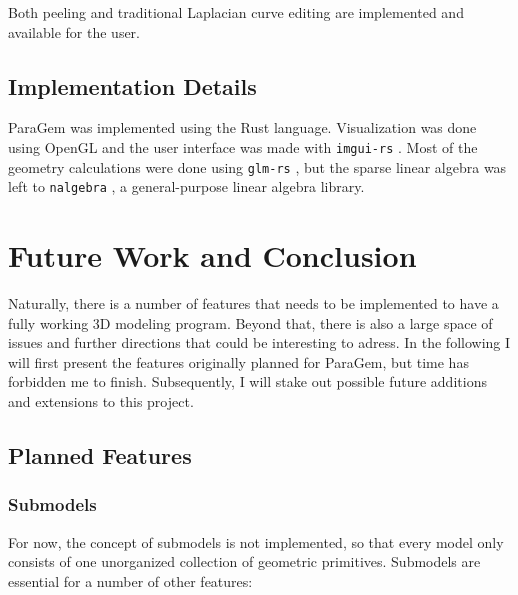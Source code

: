 \documentclass[english]{article}
\begin{document}
Both peeling and traditional Laplacian curve editing are implemented and available for the user.

\subsection{Implementation Details}


ParaGem was implemented using the Rust language. Visualization was done using OpenGL and the user interface was made with \texttt{imgui-rs} \cite{imguirs}. Most of the geometry calculations were done using \texttt{glm-rs} \cite{glmrs}, but the sparse linear algebra was left to \texttt{nalgebra} \cite{nalgebra}, a general-purpose linear algebra library.


\pagebreak

\section{Future Work and Conclusion} \label{section_future_work}


Naturally, there is a number of features that needs to be implemented to have a fully working 3D modeling program. Beyond that, there is also a large space of issues and further directions that could be interesting to adress. In the following I will first present the features originally planned for ParaGem, but time has forbidden me to finish. Subsequently, I will stake out possible future additions and extensions to this project.

\subsection{Planned Features}

\subsubsection{Submodels}


For now, the concept of submodels is not implemented, so that every model only consists of one unorganized collection of geometric primitives. Submodels are essential for a number of other features:
\end{document}
